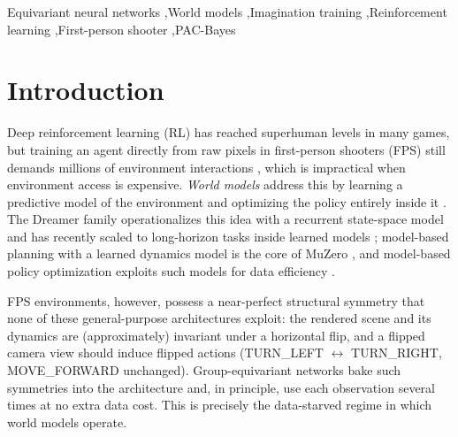 \documentclass[preprint,12pt]{elsarticle}
\begin{document}
\begin{frontmatter}
\begin{keyword}
Equivariant neural networks \sep World models \sep Imagination training \sep Reinforcement learning \sep First-person shooter \sep PAC-Bayes
\end{keyword}

\end{frontmatter}

\section{Introduction}
Deep reinforcement learning (RL) has reached superhuman levels in many
games, but training an agent directly from raw pixels in first-person
shooters (FPS) still demands millions of environment interactions
\cite{fps2017,vizdoom2016}, which is impractical when environment access is
expensive. \emph{World models} address this by learning a predictive model
of the environment and optimizing the policy entirely inside it
\cite{worldmodels2018}. The Dreamer family operationalizes this idea with a
recurrent state-space model \cite{dreamerv1,dreamerv2,dreamerv3} and has
recently scaled to long-horizon tasks inside learned models
\cite{dreamer42025}; model-based planning with a learned dynamics model is
the core of MuZero \cite{muzero2020}, and model-based policy optimization
exploits such models for data efficiency \cite{mbpo2019}.

FPS environments, however, possess a near-perfect structural symmetry that
none of these general-purpose architectures exploit: the rendered scene and
its dynamics are (approximately) invariant under a horizontal flip, and a
flipped camera view should induce flipped actions
(TURN\_LEFT $\leftrightarrow$ TURN\_RIGHT, MOVE\_FORWARD unchanged).
Group-equivariant networks \cite{gcnn2016} bake such symmetries into the
architecture and, in principle, use each observation several times at no extra
data cost. This is precisely the data-starved regime in which world models
operate.
\end{document}
